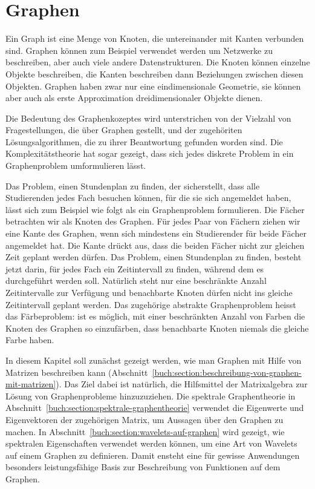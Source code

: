 %
%
%
\chapter{Graphen
\label{buch:chapter:graphen}}
\rhead{}
Ein Graph ist eine Menge von Knoten, die untereinander mit Kanten
verbunden sind.
Graphen können zum Beispiel verwendet werden um Netzwerke zu beschreiben,
aber auch viele andere Datenstrukturen.
%
Die Knoten können einzelne Objekte beschreiben, die Kanten beschreiben
dann Beziehungen zwischen diesen Objekten.
Graphen haben zwar nur eine eindimensionale Geometrie, sie können aber auch als
erste Approximation dreidimensionaler Objekte dienen.

Die Bedeutung des Graphenkozeptes wird unterstrichen von der Vielzahl
von Fragestellungen, die über Graphen gestellt, und der
zugehöriten Lösungsalgorithmen, die zu ihrer Beantwortung gefunden
worden sind.
Die Komplexitätstheorie hat sogar gezeigt, dass sich jedes diskrete
Problem in ein Graphenproblem umformulieren lässt.
%

Das Problem, einen Stundenplan zu finden, der sicherstellt, dass
alle Studierenden jedes Fach besuchen können, für die sie sich
angemeldet haben, lässt sich zum Beispiel wie folgt als ein
Graphenproblem formulieren.
Die Fächer betrachten wir als Knoten des Graphen.
Für jedes Paar von Fächern ziehen wir eine Kante des Graphen, wenn 
sich mindestens ein Studierender für beide Fächer angemeldet hat.
Die Kante drückt aus, dass die beiden Fächer nicht zur gleichen Zeit
geplant werden dürfen.
Das Problem, einen Stundenplan zu finden, besteht jetzt darin, für
jedes Fach ein Zeitintervall zu finden, während dem es durchgeführt
werden soll.
%
Natürlich steht nur eine beschränkte Anzahl Zeitintervalle zur Verfügung
und benachbarte Knoten dürfen nicht ins gleiche Zeitintervall geplant
werden.
Das zugehörige abstrakte Graphenproblem heisst das Färbeproblem: 
%
ist es möglich, mit einer beschränkten Anzahl von Farben die Knoten
des Graphen so einzufärben, dass benachbarte Knoten niemals die gleiche
Farbe haben.

In diesem Kapitel soll zunächst gezeigt werden, wie man Graphen mit 
Hilfe von Matrizen beschreiben kann
(Abschnitt~\ref{buch:section:beschreibung-von-graphen-mit-matrizen}).
Das Ziel dabei ist natürlich, die Hilfsmittel der Matrixalgebra
zur Lösung von Graphenprobleme hinzuzuziehen.
Die spektrale Graphentheorie in
Abschnitt~\ref{buch:section:spektrale-graphentheorie} verwendet
die Eigenwerte und Eigenvektoren der zugehörigen Matrix, um Aussagen
über den Graphen zu machen.
%
In Abschnitt~\ref{buch:section:wavelets-auf-graphen} wird gezeigt,
wie spektralen Eigenschaften verwendet werden können, um eine
Art von Wavelets auf einem Graphen zu definieren.
Damit ensteht eine für gewisse Anwendungen besonders leistungsfähige
Basis zur Beschreibung von Funktionen auf dem Graphen.





